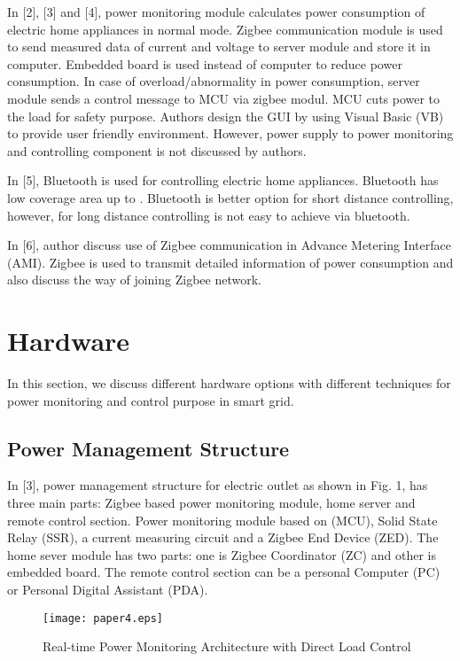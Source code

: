 \documentclass[10pt, conference, compsocconf]{IEEEtran}
\begin{document}
In [2], [3] and [4], power monitoring module calculates power consumption of electric home appliances in normal mode. Zigbee communication module is used to send measured data of current and voltage to server module and store it in computer. Embedded board is used instead of computer to reduce power consumption. In case of overload/abnormality in power consumption, server module sends a control message to MCU via zigbee modul. MCU cuts power to the load  for safety purpose. Authors design the GUI by using Visual Basic (VB) to provide user friendly environment. However, power supply to power monitoring and controlling component is not discussed by authors.

In [5], Bluetooth is used for controlling electric home appliances. Bluetooth has low coverage area up to . Bluetooth is better option for short distance controlling, however, for long distance controlling is not easy to achieve via bluetooth.

In [6], author discuss use of Zigbee communication in Advance Metering Interface (AMI). Zigbee is used to transmit detailed information of power consumption and also discuss the way of joining Zigbee network.

\section{Hardware}
In this section, we discuss different hardware options with different techniques for power monitoring and control purpose in smart grid.

\subsection{Power Management Structure}
In [3], power management structure for electric outlet as shown in Fig. 1, has three main parts: Zigbee based power monitoring module, home server and remote control section. Power monitoring module based on (MCU), Solid State Relay (SSR), a current measuring circuit and a Zigbee End Device (ZED). The home sever module has two parts: one is Zigbee Coordinator (ZC) and other is embedded board. The remote control section can be a personal Computer (PC) or Personal Digital Assistant (PDA).

\begin{figure*}[t]
\centering
  \texttt{[image: paper4.eps]}
  \caption{Real-time Power Monitoring Architecture with Direct Load Control}
\end{figure*}
\end{document}
